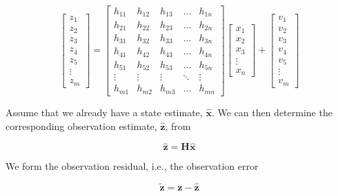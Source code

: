 \documentclass[12pt]{article}
\begin{document}
\begin{equation*}
    \begin{bmatrix}
    z_1 \\
    z_2 \\
    z_3 \\
    z_4 \\
    z_5 \\
    \vdots \\
    z_m
    \end{bmatrix}
    =
    \begin{bmatrix}
    h_{11} & h_{12} & h_{13} & \dots & h_{1n} \\
    h_{21} & h_{22} & h_{23} & \dots & h_{2n} \\
    h_{31} & h_{32} & h_{33} & \dots & h_{3n} \\
    h_{41} & h_{42} & h_{43} & \dots & h_{4n} \\
    h_{51} & h_{52} & h_{53} & \dots & h_{5n} \\
    \vdots & \vdots & \vdots & \ddots & \vdots \\
    h_{m1} & h_{m2} & h_{m3} & \dots & h_{mn}
    \end{bmatrix}
    \begin{bmatrix}
    x_1 \\
    x_2 \\
    x_3 \\
    \vdots \\
    x_n
    \end{bmatrix}
    +
    \begin{bmatrix}
    v_1 \\
    v_2 \\
    v_3 \\
    v_4 \\
    v_5 \\
    \vdots \\
    v_m
    \end{bmatrix}
\end{equation*}

Assume that we already have a state estimate, $\hat{\mathbf{x}}$. We can then determine the
corresponding observation estimate, $\hat{\mathbf{z}}$, from

\begin{equation*}
    \hat{\mathbf{z}} = \mathbf{H} \hat{\mathbf{x}}
\end{equation*}

We form the observation residual, i.e., the observation error

\begin{equation*}
    \tilde{\mathbf{z}} = \mathbf{z} - \hat{\mathbf{z}}
\end{equation*}
\end{document}
